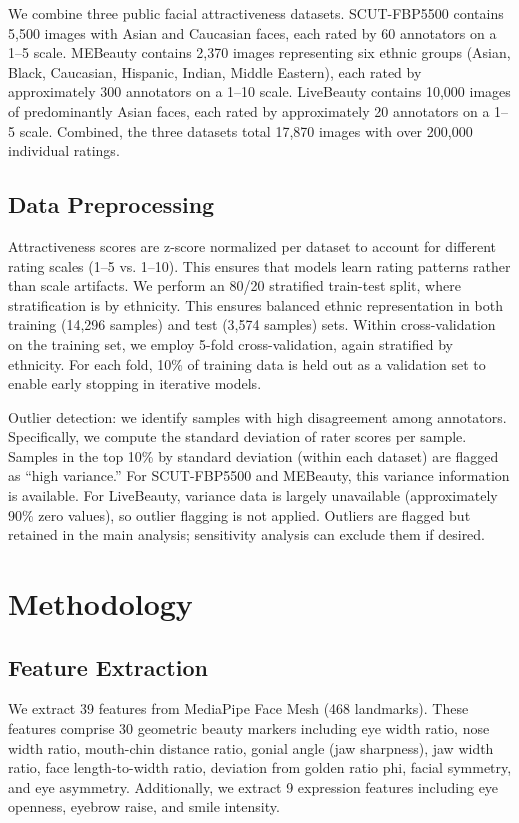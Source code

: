 \documentclass[a4paper,oneside,bibliography=totoc]{scrbook}
\begin{document}
We combine three public facial attractiveness datasets. SCUT-FBP5500 contains 5,500 images with Asian and Caucasian faces, each rated by 60 annotators on a 1--5 scale. MEBeauty contains 2,370 images representing six ethnic groups (Asian, Black, Caucasian, Hispanic, Indian, Middle Eastern), each rated by approximately 300 annotators on a 1--10 scale. LiveBeauty contains 10,000 images of predominantly Asian faces, each rated by approximately 20 annotators on a 1--5 scale. Combined, the three datasets total 17,870 images with over 200,000 individual ratings.

\section{Data Preprocessing}

Attractiveness scores are z-score normalized per dataset to account for different rating scales (1--5 vs. 1--10). This ensures that models learn rating patterns rather than scale artifacts. We perform an 80/20 stratified train-test split, where stratification is by ethnicity. This ensures balanced ethnic representation in both training (14,296 samples) and test (3,574 samples) sets. Within cross-validation on the training set, we employ 5-fold cross-validation, again stratified by ethnicity. For each fold, 10\% of training data is held out as a validation set to enable early stopping in iterative models.

Outlier detection: we identify samples with high disagreement among annotators. Specifically, we compute the standard deviation of rater scores per sample. Samples in the top 10\% by standard deviation (within each dataset) are flagged as ``high variance.'' For SCUT-FBP5500 and MEBeauty, this variance information is available. For LiveBeauty, variance data is largely unavailable (approximately 90\% zero values), so outlier flagging is not applied. Outliers are flagged but retained in the main analysis; sensitivity analysis can exclude them if desired.

\chapter{Methodology}
\label{ch:methodology}

\section{Feature Extraction}

We extract 39 features from MediaPipe Face Mesh (468 landmarks). These features comprise 30 geometric beauty markers including eye width ratio, nose width ratio, mouth-chin distance ratio, gonial angle (jaw sharpness), jaw width ratio, face length-to-width ratio, deviation from golden ratio phi, facial symmetry, and eye asymmetry. Additionally, we extract 9 expression features including eye openness, eyebrow raise, and smile intensity.
\end{document}
